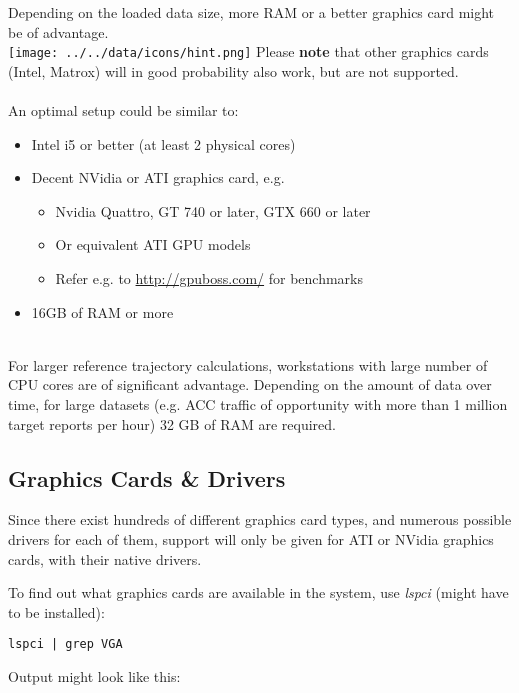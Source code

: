Depending on the loaded data size, more RAM or a better graphics card might be of advantage. \\

\texttt{[image: ../../data/icons/hint.png]} Please \textbf{note} that other graphics cards (Intel, Matrox) will in good probability also work, but are not supported. \\\\

An optimal setup could be similar to:

\begin{itemize}  
\item Intel i5 or better (at least 2 physical cores)
\item Decent NVidia or ATI graphics card, e.g.
\begin{itemize}  
\item Nvidia Quattro, GT 740 or later, GTX 660 or later
\item Or equivalent ATI GPU models
\item Refer e.g. to \url{http://gpuboss.com/} for benchmarks
\end{itemize}
\item 16GB of RAM or more
\end{itemize} \ \\

For larger reference trajectory calculations, workstations with large number of CPU cores are of significant advantage. Depending on the amount of data over time, for large datasets (e.g. ACC traffic of opportunity with more than 1 million target reports per hour) 32 GB of RAM are required.


\subsection{Graphics Cards \& Drivers}
\label{sec:graphics_installation}

Since there exist hundreds of different graphics card types, and numerous possible drivers for each of them, support will only be given for ATI or NVidia graphics cards, with their native drivers.

To find out what graphics cards are available in the system, use \textit{lspci} (might have to be installed):

\begin{lstlisting}
lspci | grep VGA
\end{lstlisting}

Output might look like this:


